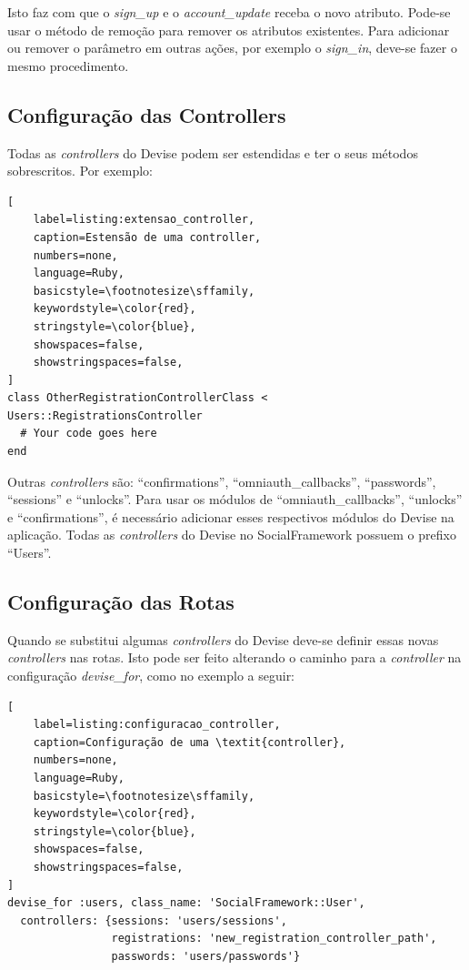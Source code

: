 Isto faz com que o \textit{sign\_up} e o \textit{account\_update} receba o novo atributo. Pode-se usar o método de remoção para remover os atributos existentes. Para adicionar ou remover o parâmetro em outras ações, por exemplo o \textit{sign\_in}, deve-se fazer o mesmo procedimento.

\subsection{Configuração das Controllers}

Todas as \textit{controllers} do Devise podem ser estendidas e ter o seus métodos sobrescritos. Por exemplo:

\begin{lstlisting}[
    label=listing:extensao_controller,
    caption=Estensão de uma controller,
    numbers=none,
    language=Ruby,
    basicstyle=\footnotesize\sffamily,
    keywordstyle=\color{red},
    stringstyle=\color{blue},
    showspaces=false,
    showstringspaces=false,
]
class OtherRegistrationControllerClass < Users::RegistrationsController
  # Your code goes here
end
\end{lstlisting}

Outras \textit{controllers} são: ``confirmations'', ``omniauth\_callbacks'', ``passwords'', ``sessions'' e ``unlocks''. Para usar os módulos de ``omniauth\_callbacks'', ``unlocks'' e ``confirmations'', é necessário adicionar esses respectivos módulos do Devise na aplicação. Todas as \textit{controllers} do Devise no SocialFramework possuem o prefixo ``Users''.

\subsection{Configuração das Rotas}

Quando se substitui algumas \textit{controllers} do Devise deve-se definir essas novas \textit{controllers} nas rotas. Isto pode ser feito alterando o caminho para a \textit{controller} na configuração \textit{devise\_for}, como no exemplo a seguir:

\begin{lstlisting}[
    label=listing:configuracao_controller,
    caption=Configuração de uma \textit{controller},
    numbers=none,
    language=Ruby,
    basicstyle=\footnotesize\sffamily,
    keywordstyle=\color{red},
    stringstyle=\color{blue},
    showspaces=false,
    showstringspaces=false,
]
devise_for :users, class_name: 'SocialFramework::User',
  controllers: {sessions: 'users/sessions',
                registrations: 'new_registration_controller_path',
                passwords: 'users/passwords'}
\end{lstlisting}

